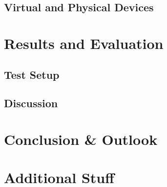\documentclass[%
]{tumDiss}
\begin{document}
\section{Virtual and Physical Devices}


\chapter{Results and Evaluation}
\section{Test Setup}
\section{Discussion}

\chapter{Conclusion \& Outlook}
\label{chap:conclusion}

\lipsum[1-4]




\printbibliography{}



\appendix
\chapter{Additional Stuff}

\lipsum[1-4]
\end{document}
